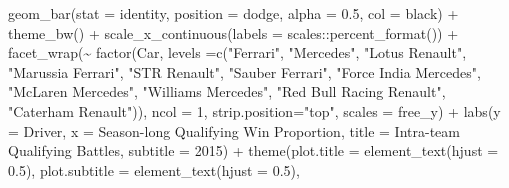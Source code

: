 \documentclass[
]{book}
\newenvironment{Shaded}{\begin{snugshade}}{\end{snugshade}}
\newcommand{\AttributeTok}[1]{\textcolor[rgb]{0.77,0.63,0.00}{#1}}
\newcommand{\DecValTok}[1]{\textcolor[rgb]{0.00,0.00,0.81}{#1}}
\newcommand{\FloatTok}[1]{\textcolor[rgb]{0.00,0.00,0.81}{#1}}
\newcommand{\FunctionTok}[1]{\textcolor[rgb]{0.00,0.00,0.00}{#1}}
\newcommand{\NormalTok}[1]{#1}
\newcommand{\SpecialCharTok}[1]{\textcolor[rgb]{0.00,0.00,0.00}{#1}}
\newcommand{\StringTok}[1]{\textcolor[rgb]{0.31,0.60,0.02}{#1}}
\begin{document}
\begin{Shaded}
\begin{Highlighting}[]
  \FunctionTok{geom\_bar}\NormalTok{(}\AttributeTok{stat =} \StringTok{\textquotesingle{}identity\textquotesingle{}}\NormalTok{, }\AttributeTok{position =} \StringTok{\textquotesingle{}dodge\textquotesingle{}}\NormalTok{, }\AttributeTok{alpha =} \FloatTok{0.5}\NormalTok{, }\AttributeTok{col =} \StringTok{\textquotesingle{}black\textquotesingle{}}\NormalTok{) }\SpecialCharTok{+}
  \FunctionTok{theme\_bw}\NormalTok{() }\SpecialCharTok{+}
  \FunctionTok{scale\_x\_continuous}\NormalTok{(}\AttributeTok{labels =}\NormalTok{ scales}\SpecialCharTok{::}\FunctionTok{percent\_format}\NormalTok{()) }\SpecialCharTok{+}
  \FunctionTok{facet\_wrap}\NormalTok{(}\SpecialCharTok{\textasciitilde{}} \FunctionTok{factor}\NormalTok{(Car, }
                      \AttributeTok{levels =}\FunctionTok{c}\NormalTok{(}\StringTok{"Ferrari"}\NormalTok{,}
                                 \StringTok{"Mercedes"}\NormalTok{,}
                                 \StringTok{"Lotus Renault"}\NormalTok{,}
                                 \StringTok{"Marussia Ferrari"}\NormalTok{,}
                                \StringTok{"STR Renault"}\NormalTok{,}
                                 \StringTok{"Sauber Ferrari"}\NormalTok{, }
                                 \StringTok{"Force India Mercedes"}\NormalTok{,}
                                 \StringTok{"McLaren Mercedes"}\NormalTok{,}
                                 \StringTok{"Williams Mercedes"}\NormalTok{,}
                                 \StringTok{"Red Bull Racing Renault"}\NormalTok{,}
                                \StringTok{"Caterham Renault"}\NormalTok{)),}
             \AttributeTok{ncol =} \DecValTok{1}\NormalTok{, }\AttributeTok{strip.position=}\StringTok{"top"}\NormalTok{, }\AttributeTok{scales =} \StringTok{\textquotesingle{}free\_y\textquotesingle{}}\NormalTok{) }\SpecialCharTok{+}
  \FunctionTok{labs}\NormalTok{(}\AttributeTok{y =} \StringTok{\textquotesingle{}Driver\textquotesingle{}}\NormalTok{,}
       \AttributeTok{x =} \StringTok{\textquotesingle{}Season{-}long Qualifying Win Proportion\textquotesingle{}}\NormalTok{,}
       \AttributeTok{title =} \StringTok{\textquotesingle{}Intra{-}team Qualifying Battles\textquotesingle{}}\NormalTok{,}
       \AttributeTok{subtitle =} \StringTok{\textquotesingle{}2015\textquotesingle{}}\NormalTok{) }\SpecialCharTok{+}
  \FunctionTok{theme}\NormalTok{(}\AttributeTok{plot.title =} \FunctionTok{element\_text}\NormalTok{(}\AttributeTok{hjust =} \FloatTok{0.5}\NormalTok{),}
        \AttributeTok{plot.subtitle =} \FunctionTok{element\_text}\NormalTok{(}\AttributeTok{hjust =} \FloatTok{0.5}\NormalTok{),}

\end{Highlighting}
\end{Shaded}
\end{document}
